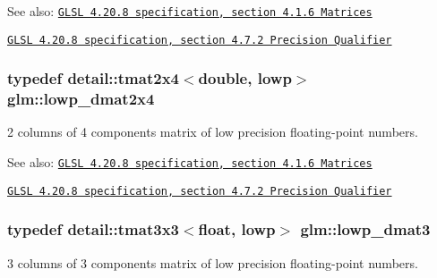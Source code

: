 \begin{Desc}
\item[See also:]\href{http://www.opengl.org/registry/doc/GLSLangSpec.4.20.8.pdf}{\tt GLSL 4.20.8 specification, section 4.1.6 Matrices} 

\href{http://www.opengl.org/registry/doc/GLSLangSpec.4.20.8.pdf}{\tt GLSL 4.20.8 specification, section 4.7.2 Precision Qualifier} \end{Desc}
\hypertarget{group__core__precision_gc2285cef559b0dc35cb9a7f22e6a2dd8}{
\subsubsection[lowp\_\-dmat2x4]{\setlength{\rightskip}{0pt plus 5cm}typedef detail::tmat2x4$<$double, lowp$>$ {\bf glm::lowp\_\-dmat2x4}}}
\label{group__core__precision_gc2285cef559b0dc35cb9a7f22e6a2dd8}


2 columns of 4 components matrix of low precision floating-point numbers.

\begin{Desc}
\item[See also:]\href{http://www.opengl.org/registry/doc/GLSLangSpec.4.20.8.pdf}{\tt GLSL 4.20.8 specification, section 4.1.6 Matrices} 

\href{http://www.opengl.org/registry/doc/GLSLangSpec.4.20.8.pdf}{\tt GLSL 4.20.8 specification, section 4.7.2 Precision Qualifier} \end{Desc}
\hypertarget{group__core__precision_g07d9423bdde2d7ff880d6ece01dc9e32}{
\subsubsection[lowp\_\-dmat3]{\setlength{\rightskip}{0pt plus 5cm}typedef detail::tmat3x3$<$float, lowp$>$ {\bf glm::lowp\_\-dmat3}}}
\label{group__core__precision_g07d9423bdde2d7ff880d6ece01dc9e32}


3 columns of 3 components matrix of low precision floating-point numbers.

